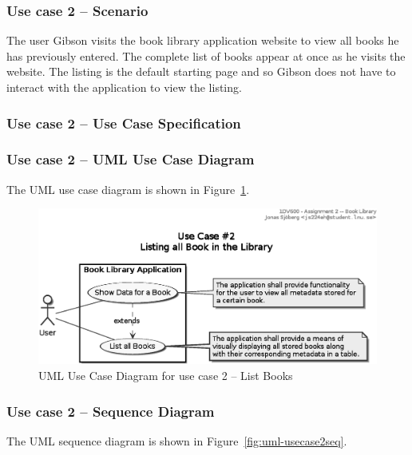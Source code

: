 \subsubsection{Use case 2 -- Scenario}\label{task-1a-usecase2}
The user Gibson visits the book library application website to view all books
he has previously entered. The complete list of books appear at once as he
visits the website. The listing is the default starting page and so Gibson does
not have to interact with the application to view the listing.


\subsubsection{Use case 2 -- Use Case Specification}\label{task-1a-usecase2spec}



\subsubsection{Use case 2 -- UML Use Case Diagram}\label{task-1a-usecase2uml}
The UML use case diagram is shown in Figure~\ref{fig:uml-usecase2}.

\begin{figure}[htbp]
  \centering
  \includegraphics[width=0.75\linewidth]{include/uml-use-case-2.eps}
  \caption{UML Use Case Diagram for use case 2 -- List Books}
  \label{fig:uml-usecase2}
\end{figure}


\subsubsection{Use case 2 -- Sequence Diagram}\label{task-1a-usecase2seq}
The UML sequence diagram is shown in Figure~\ref{fig:uml-usecase2seq}.

